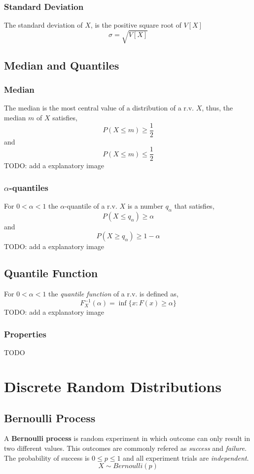 \subsubsection{Standard Deviation}
The standard deviation of $X$, is the positive square root of $V[X]$
\[ \sigma = \sqrt{V[X]} \]


\subsection{Median and Quantiles}
\subsubsection{Median}
The median is the most central value of a distribution of a r.v. $X$, thus, the median $m$ of $X$ satisfies,
\[ P(X \leq m) \geq \frac{1}{2} \]
and
\[ P(X \leq m) \leq \frac{1}{2} \]
TODO: add a explanatory image

\subsubsection{$\alpha$-quantiles}
For $0 < \alpha < 1$ the $\alpha$-quantile of a r.v. $X$ is a number $q_\alpha$ that satisfies,
\[ P(X \leq q_\alpha) \geq \alpha \] 
and
\[ P(X \geq q_\alpha) \geq 1- \alpha \]
TODO: add a explanatory image

\subsection{Quantile Function}
For $0 < \alpha < 1$ the \textit{quantile function} of a r.v. is defined as,
\[ F^{-1}_X (\alpha) = \inf \{ x : F(x) \geq \alpha  \} \]
TODO: add a explanatory image

\subsubsection{Properties}
TODO

\section{Discrete Random Distributions}
\subsection{Bernoulli Process}
A \textbf{Bernoulli process} is random experiment in which outcome can only result in two different values. This outcomes are
commonly refered as \textit{success} and \textit{failure}. The probability of success is $0 \leq p \leq 1$ and all experiment
trials are \textit{independent}.
\[ X \sim Bernoulli(p) \]

